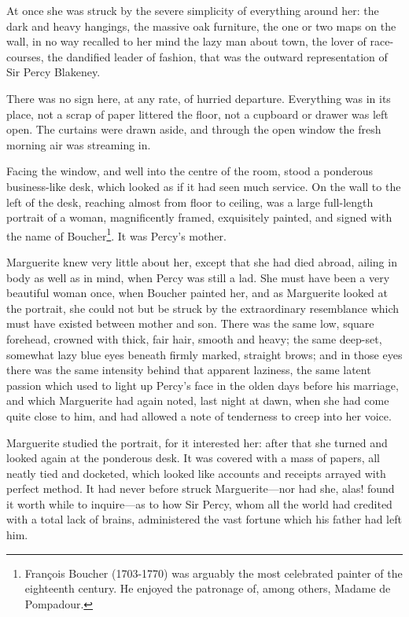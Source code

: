 At once she was struck by the severe simplicity of everything around her: the dark and heavy hangings, the massive oak furniture, the one or two maps on the wall, in no way recalled to her mind the lazy man about town, the lover of race-courses, the dandified leader of fashion, that was the outward representation of Sir Percy Blakeney.

There was no sign here, at any rate, of hurried departure. Every\-thing was in its place, not a scrap of paper littered the floor, not a cupboard or drawer was left open. The curtains were drawn aside, and through the open window the fresh morning air was streaming in.

Facing the window, and well into the centre of the room, stood a ponderous business-like desk, which looked as if it had seen much service. On the wall to the left of the desk, reaching almost from floor to ceiling, was a large full-length portrait of a woman, magnificently framed, exquisitely painted, and signed with the name of Boucher\footnote{François Boucher (1703-1770) was arguably the most celebrated painter of the eighteenth century. He enjoyed the patronage of, among others, Madame de Pompadour.}. It was Percy's mother.

Marguerite knew very little about her, except that she had died abroad, ailing in body as well as in mind, when Percy was still a lad. She must have been a very beautiful woman once, when Boucher painted her, and as Marguerite looked at the portrait, she could not but be struck by the extraordinary resemblance which must have existed between mother and son. There was the same low, square forehead, crowned with thick, fair hair, smooth and heavy; the same deep-set, somewhat lazy blue eyes beneath firmly marked, straight brows; and in those eyes there was the same intensity behind that apparent laziness, the same latent passion which used to light up Percy's face in the olden days before his marriage, and which Marguerite had again noted, last night at dawn, when she had come quite close to him, and had allowed a note of tenderness to creep into her voice.

Marguerite studied the portrait, for it interested her: after that she turned and looked again at the ponderous desk. It was covered with a mass of papers, all neatly tied and docketed, which looked like accounts and receipts arrayed with perfect method. It had never before struck Marguerite---nor had she, alas! found it worth while to inquire---as to how Sir Percy, whom all the world had credited with a total lack of brains, administered the vast fortune which his father had left him.

